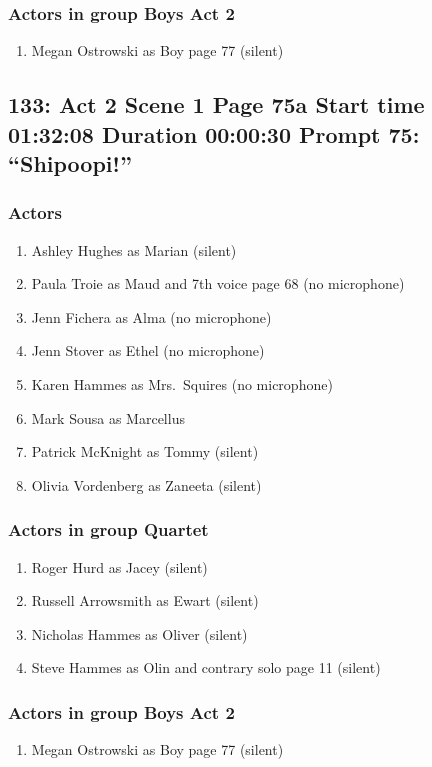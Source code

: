 \subsubsection{Actors in group Boys Act 2}
\begin{enumerate}
\item Megan Ostrowski as Boy page 77 (silent)
\end{enumerate}


\subsection{133: Act 2 Scene 1 Page 75a Start time 01:32:08 Duration 00:00:30 Prompt 75: ``Shipoopi!''}

\subsubsection{Actors}
\begin{enumerate}
\item Ashley Hughes as Marian (silent)
\item Paula Troie as Maud and 7th voice page 68 (no microphone)
\item Jenn Fichera as Alma (no microphone)
\item Jenn Stover as Ethel (no microphone)
\item Karen Hammes as Mrs.~Squires (no microphone)
\item Mark Sousa as Marcellus
\item Patrick McKnight as Tommy (silent)
\item Olivia Vordenberg as Zaneeta (silent)
\end{enumerate}
\subsubsection{Actors in group Quartet}
\begin{enumerate}
\item Roger Hurd as Jacey (silent)
\item Russell Arrowsmith as Ewart (silent)
\item Nicholas Hammes as Oliver (silent)
\item Steve Hammes as Olin and contrary solo page 11 (silent)
\end{enumerate}
\subsubsection{Actors in group Boys Act 2}
\begin{enumerate}
\item Megan Ostrowski as Boy page 77 (silent)
\end{enumerate}

